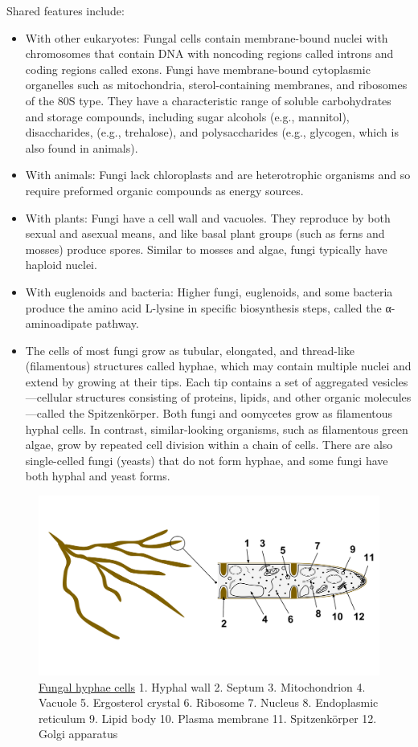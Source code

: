 Shared features include:

\begin{itemize}
\tightlist
\item
  With other eukaryotes: Fungal cells contain membrane-bound nuclei with chromosomes that contain DNA with noncoding regions called introns and coding regions called exons. Fungi have membrane-bound cytoplasmic organelles such as mitochondria, sterol-containing membranes, and ribosomes of the 80S type. They have a characteristic range of soluble carbohydrates and storage compounds, including sugar alcohols (e.g., mannitol), disaccharides, (e.g., trehalose), and polysaccharides (e.g., glycogen, which is also found in animals).
\item
  With animals: Fungi lack chloroplasts and are heterotrophic organisms and so require preformed organic compounds as energy sources.
\item
  With plants: Fungi have a cell wall and vacuoles. They reproduce by both sexual and asexual means, and like basal plant groups (such as ferns and mosses) produce spores. Similar to mosses and algae, fungi typically have haploid nuclei.
\item
  With euglenoids and bacteria: Higher fungi, euglenoids, and some bacteria produce the amino acid L-lysine in specific biosynthesis steps, called the α-aminoadipate pathway.
\item
  The cells of most fungi grow as tubular, elongated, and thread-like (filamentous) structures called hyphae, which may contain multiple nuclei and extend by growing at their tips. Each tip contains a set of aggregated vesicles---cellular structures consisting of proteins, lipids, and other organic molecules---called the Spitzenkörper. Both fungi and oomycetes grow as filamentous hyphal cells. In contrast, similar-looking organisms, such as filamentous green algae, grow by repeated cell division within a chain of cells. There are also single-celled fungi (yeasts) that do not form hyphae, and some fungi have both hyphal and yeast forms.
\end{itemize}



\begin{figure}

{\centering \includegraphics[width=0.7\linewidth]{./figures/fungi/HYPHAE} 

}

\caption{\href{https://commons.wikimedia.org/wiki/File:HYPHAE.png}{Fungal hyphae cells} 1. Hyphal wall 2. Septum 3. Mitochondrion 4. Vacuole 5. Ergosterol crystal 6. Ribosome 7. Nucleus 8. Endoplasmic reticulum 9. Lipid body 10. Plasma membrane 11. Spitzenkörper 12. Golgi apparatus}\label{fig:hyphaecell}
\end{figure}

